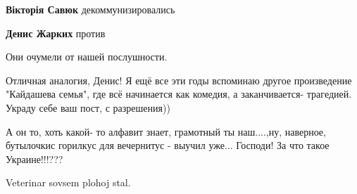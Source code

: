 \begin{itemize}
\begin{itemize}
\textbf{Вікторія Савюк} декоммунизировались

 
\textbf{Денис Жарких} против
\end{itemize} %

 
Они очумели от нашей послушности.

 

Отличная аналогия, Денис! Я ещё все эти годы вспоминаю другое произведение
"Кайдашева семья", где всё начинается как комедия, а заканчивается- трагедией.
Украду себе ваш пост, с разрешения))


 

А он то, хоть какой- то алфавит знает, грамотный ты наш....,ну, наверное,
бутылочкис горилкус для вечернитус - выучил уже... Господи! За что такое
Украине!!!???


 
Veterinar sovsem plohoj stal.

 


\end{itemize}
